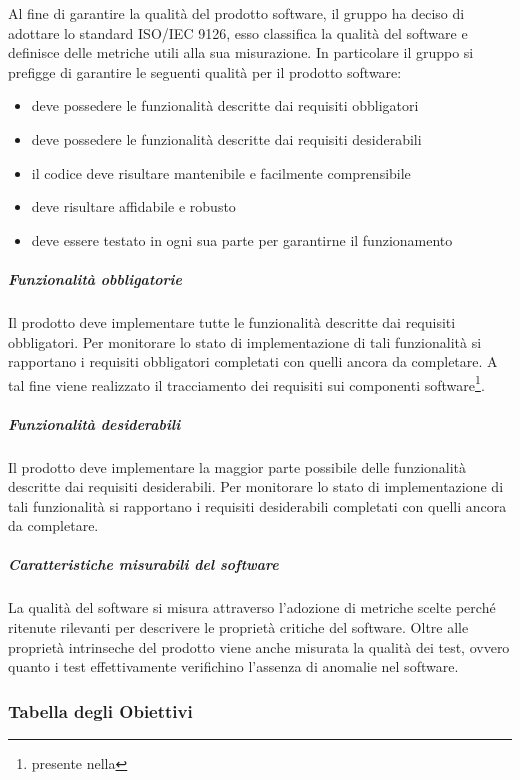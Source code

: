 Al fine di garantire la qualità del prodotto software, il gruppo ha deciso di adottare lo standard
ISO/IEC 9126, esso classifica la qualità del software e definisce delle metriche utili alla sua
misurazione. In particolare il gruppo si prefigge di garantire le seguenti qualità per il prodotto
software:
\begin{itemize}
\item deve possedere le funzionalità descritte dai requisiti obbligatori
\item deve possedere le funzionalità descritte dai requisiti desiderabili
\item il codice deve risultare mantenibile e facilmente comprensibile
\item deve risultare affidabile e robusto
\item deve essere testato in ogni sua parte per garantirne il
  funzionamento
\end{itemize}
\subparagraph{Funzionalità obbligatorie}
Il prodotto deve implementare tutte le funzionalità descritte dai
requisiti obbligatori. Per monitorare lo stato di implementazione di
tali funzionalità si rapportano i requisiti obbligatori
completati con quelli ancora da completare. A tal fine viene
realizzato il tracciamento dei requisiti sui componenti
software\footnote{presente nella }.
\subparagraph{Funzionalità desiderabili}
Il prodotto deve implementare la maggior parte possibile delle
funzionalità descritte dai requisiti desiderabili. Per monitorare lo
stato di implementazione di tali funzionalità si rapportano i
requisiti desiderabili
completati con quelli ancora da completare.
\subparagraph{Caratteristiche misurabili del software}
La qualità del software si misura attraverso l'adozione di metriche
scelte perché ritenute rilevanti per descrivere le proprietà
critiche del software.
Oltre alle proprietà intrinseche del prodotto viene anche misurata la
qualità dei test, ovvero quanto i test effettivamente verifichino
l'assenza di anomalie nel software.

\subsubsection{Tabella degli Obiettivi}

